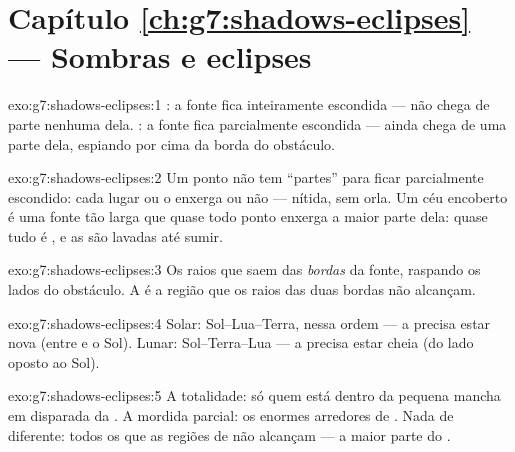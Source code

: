 \section*{Capítulo \ref{ch:g7:shadows-eclipses} --- Sombras e eclipses}

\begin{solution}{exo:g7:shadows-eclipses:1}
: a fonte fica inteiramente escondida --- não chega  de parte
nenhuma dela. : a fonte fica parcialmente escondida --- ainda
chega  de uma parte dela, espiando por cima da borda do obstáculo.
\end{solution}

\begin{solution}{exo:g7:shadows-eclipses:2}
Um ponto não tem ``partes'' para ficar parcialmente escondido: cada
lugar ou o enxerga ou não ---  nítida, sem orla. Um céu
encoberto é uma fonte tão larga que quase todo ponto enxerga a maior
parte dela: quase tudo é , e as  são lavadas até
sumir.
\end{solution}

\begin{solution}{exo:g7:shadows-eclipses:3}
Os raios que saem das \emph{bordas} da fonte, raspando os lados do
obstáculo. A  é a região que os raios das duas bordas não
alcançam.
\end{solution}

\begin{solution}{exo:g7:shadows-eclipses:4}
Solar: Sol--Lua--Terra, nessa ordem --- a  precisa estar nova
(entre  e o Sol). Lunar: Sol--Terra--Lua --- a  precisa estar
cheia (do lado oposto ao Sol).
\end{solution}

\begin{solution}{exo:g7:shadows-eclipses:5}
A totalidade: só quem está dentro da pequena mancha em disparada da
. A mordida parcial: os enormes arredores de . Nada de
diferente: todos os que as regiões de  não alcançam --- a maior
parte do .
\end{solution}

